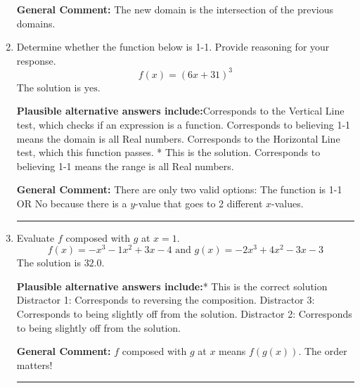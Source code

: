 \documentclass{extbook}[14pt]
\newcommand{\litem}[1]{\item #1

\rule{\textwidth}{0.4pt}}
\begin{document}
\begin{enumerate}
{\begin{enumerate}[label=\Alph*.]
\end{enumerate}

\textbf{General Comment:} The new domain is the intersection of the previous domains.
}
\litem{
Determine whether the function below is 1-1. Provide reasoning for your response.
\[ f(x) = (6 x + 31)^3 \]The solution is \( \text{yes} \).\begin{enumerate}[label=\Alph*.]
\textbf{Plausible alternative answers include:}Corresponds to the Vertical Line test, which checks if an expression is a function.
Corresponds to believing 1-1 means the domain is all Real numbers.
Corresponds to the Horizontal Line test, which this function passes.
* This is the solution.
Corresponds to believing 1-1 means the range is all Real numbers.
\end{enumerate}

\textbf{General Comment:} There are only two valid options: The function is 1-1 OR No because there is a $y$-value that goes to 2 different $x$-values.
}
\litem{
Evaluate $f$ composed with $g$ at $x=1$.
\[ f(x) = -x^{3} -1 x^{2} +3 x -4 \text{ and } g(x) = -2x^{3} +4 x^{2} -3 x -3 \]The solution is \( 32.0 \).\begin{enumerate}[label=\Alph*.]
\textbf{Plausible alternative answers include:}* This is the correct solution
 Distractor 1: Corresponds to reversing the composition.
 Distractor 3: Corresponds to being slightly off from the solution.
 Distractor 2: Corresponds to being slightly off from the solution.

\end{enumerate}

\textbf{General Comment:} $f$ composed with $g$ at $x$ means $f(g(x))$. The order matters!
}
\end{enumerate}
\end{document}
